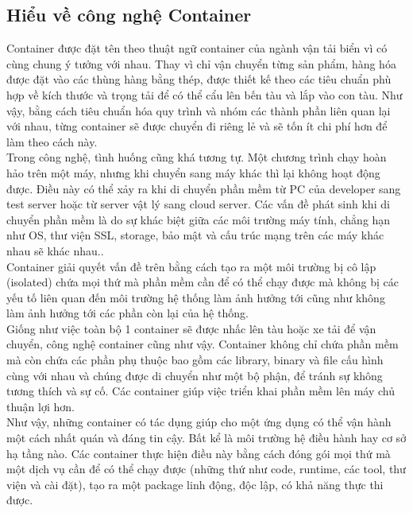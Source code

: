 \documentclass[14pt,a4paper]{book}
\begin{document}
			\subsection{Hiểu về công nghệ Container}
		\hspace{0.6cm}Container được đặt tên theo thuật ngữ container của ngành vận tải biển vì có cùng chung ý tưởng với nhau. Thay vì chỉ vận chuyển từng sản phẩm, hàng hóa được đặt vào các thùng hàng bằng thép, được thiết kế theo các tiêu chuẩn phù hợp về kích thước và trọng tải để có thể cẩu lên bến tàu và lắp vào con tàu. Như vậy, bằng cách tiêu chuẩn hóa quy trình và nhóm các thành phần liên quan lại với nhau, từng container sẽ được chuyển đi riêng lẻ và sẽ tốn ít chi phí hơn để làm theo cách này.\\
		
		Trong công nghệ, tình huống cũng khá tương tự. Một chương trình chạy hoàn hảo trên một máy, nhưng khi chuyển sang máy khác thì lại không hoạt động được. Điều này có thể xảy ra khi di chuyển phần mềm từ PC của developer sang test server hoặc từ server vật lý sang cloud server. Các vấn đề phát sinh khi di chuyển phần mềm là do sự khác biệt giữa các môi trường máy tính, chẳng hạn như OS, thư viện SSL, storage, bảo mật và cấu trúc mạng trên các máy khác nhau sẽ khác nhau..\\
		
		Container giải quyết vấn đề trên bằng cách tạo ra một môi trường bị cô lập (isolated) chứa mọi thứ mà phần mềm cần để có thể chạy được mà không bị các yếu tố liên quan đến môi trường hệ thống làm ảnh hưởng tới cũng như không làm ảnh hưởng tới các phần còn lại của hệ thống.\\
		
		Giống như việc toàn bộ 1 container sẽ được nhấc lên tàu hoặc xe tải để vận chuyển, công nghệ container cũng như vậy. Container không chỉ chứa phần mềm mà còn chứa các phần phụ thuộc bao gồm các library, binary và file cấu hình cùng với nhau và chúng được di chuyển như một bộ phận, để tránh sự không tương thích và sự cố. Các container giúp việc triển khai phần mềm lên máy chủ thuận lợi hơn.\\
		
		Như vậy, những container có tác dụng giúp cho một ứng dụng có thể vận hành một cách nhất quán và đáng tin cậy. Bất kể là môi trường hệ điều hành hay cơ sở hạ tầng nào. Các container thực hiện điều này bằng cách đóng gói mọi thứ mà một dịch vụ cần để có thể chạy được (những thứ như code, runtime, các tool, thư viện và cài đặt), tạo ra một package linh động, độc lập, có khả năng thực thi được.
\end{document}
